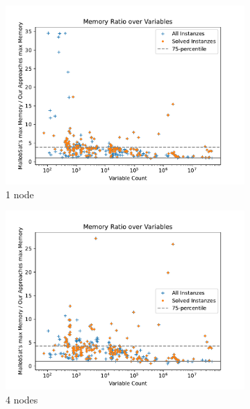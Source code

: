 \documentclass[12pt,a4paper,twoside]{scrartcl}
\numberwithin{equation}{section}
\begin{document}
\begin{figure}
  \center
  \begin{subfigure}[c]{.45\textwidth}
    \center
    \includegraphics[scale=.45]{plots/1node_compare/mem_ratio_over_vars.pdf}
    \caption{1 node}
    \label{fig:memRatiosVars1node}
  \end{subfigure}
  \begin{subfigure}[c]{.45\textwidth}
    \center
    \includegraphics[scale=.45]{plots/4node_compare/mem_ratio_over_vars.pdf}
    \caption{4 nodes}
    \label{fig:memRatiosVars4node}
  \end{subfigure}
  \begin{subfigure}[c]{.45\textwidth}
    \center

\end{subfigure}
\end{figure}
\end{document}
